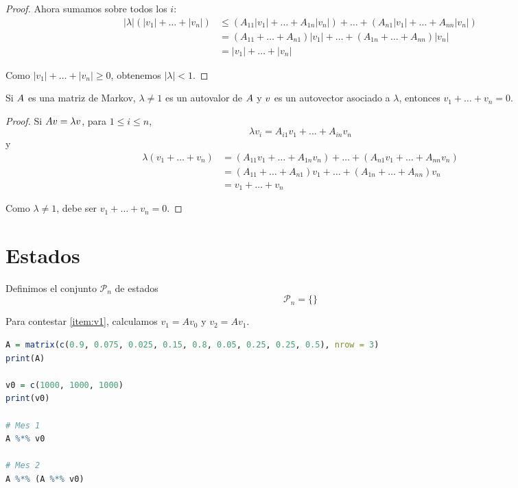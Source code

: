 \begin{ejemplo}
\begin{proof}
Ahora sumamos sobre todos los $i$:
$$
\begin{aligned}
|\lambda|(|v_1| + \dots + |v_n|) &\le (A_{11} |v_1| + \dots + A_{1n} |v_n|) + \dots + (A_{n1} |v_1| + \dots + A_{nn} |v_n|) \\
&= (A_{11} + \dots + A_{n1}) |v_1| + \dots + (A_{1n} + \dots + A_{nn}) |v_n| \\
&= |v_1| + \dots + |v_n|
\end{aligned}
$$

Como $|v_1| + \dots + |v_n| \ge 0$, obtenemos $|\lambda| < 1$.
\end{proof}

\begin{prop}
Si $\Ab$ es una matriz de Markov, $\lambda \neq 1$ es un autovalor de $\Ab$ y $\vb$ es un autovector asociado a $\lambda$, entonces $v_1 + \dots + v_n = 0$.
\end{prop}

\begin{proof}
Si $\Ab \vb = \lambda \vb$, para $1 \le i \le n$,
$$
\lambda v_i = A_{i1} v_1 + \dots + A_{in} v_n
$$
y
$$
\begin{aligned}
\lambda(v_1 + \dots + v_n) &= (A_{11} v_1 + \dots + A_{1n} v_n) + \dots + (A_{n1} v_1 + \dots + A_{nn} v_n) \\
&= (A_{11} + \dots + A_{n1}) v_1 + \dots + (A_{1n} + \dots + A_{nn}) v_n \\
&= v_1 + \dots + v_n
\end{aligned}
$$

Como $\lambda \ne 1$, debe ser $v_1 + \dots + v_n = 0$.
\end{proof}


\section{Estados}

Definimos el conjunto $\mathcal{P}_n$ de estados
$$
\mathcal{P}_n = \{\}
$$






Para contestar \ref{item:v1}, calculamos $v_1 = A v_0$ y $v_2 = A v_1$.

\begin{lstlisting}[language=R]
A = matrix(c(0.9, 0.075, 0.025, 0.15, 0.8, 0.05, 0.25, 0.25, 0.5), nrow = 3)
print(A)

v0 = c(1000, 1000, 1000)
print(v0)

# Mes 1
A %*% v0

# Mes 2
A %*% (A %*% v0)
\end{lstlisting}


\end{ejemplo}
